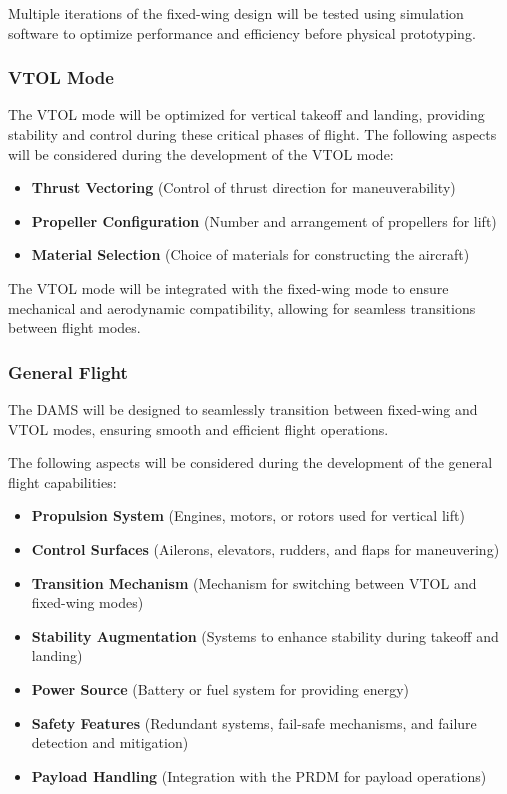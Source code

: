 \documentclass[12pt]{article}
\begin{document}
Multiple iterations of the fixed-wing design will be tested using simulation software to optimize performance and efficiency before physical prototyping.

\subsubsection{VTOL Mode}
The VTOL mode will be optimized for vertical takeoff and landing, providing stability and control during these critical phases of flight.
The following aspects will be considered during the development of the VTOL mode:
\begin{itemize}
    \item \textbf{Thrust Vectoring} (Control of thrust direction for maneuverability)
    \item \textbf{Propeller Configuration} (Number and arrangement of propellers for lift)
    \item \textbf{Material Selection} (Choice of materials for constructing the aircraft)
\end{itemize}

The VTOL mode will be integrated with the fixed-wing mode to ensure mechanical and aerodynamic compatibility, allowing for seamless transitions between flight modes.

\subsubsection{General Flight}
The DAMS will be designed to seamlessly transition between fixed-wing and VTOL modes, ensuring smooth and efficient flight operations.

The following aspects will be considered during the development of the general flight capabilities:
\begin{itemize}
    \item \textbf{Propulsion System} (Engines, motors, or rotors used for vertical lift)
    \item \textbf{Control Surfaces} (Ailerons, elevators, rudders, and flaps for maneuvering)
    \item \textbf{Transition Mechanism} (Mechanism for switching between VTOL and fixed-wing modes)
    \item \textbf{Stability Augmentation} (Systems to enhance stability during takeoff and landing)
    \item \textbf{Power Source} (Battery or fuel system for providing energy)
    \item \textbf{Safety Features} (Redundant systems, fail-safe mechanisms, and failure detection and mitigation)
    \item \textbf{Payload Handling} (Integration with the PRDM for payload operations)
\end{itemize}
\end{document}
